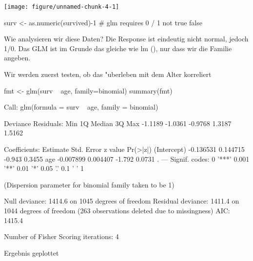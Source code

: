 \documentclass[a4paper,twoside]{tufte-book}\usepackage[]{graphicx}\usepackage[]{color}
\makeatletter
\def\maxwidth{ %
  \ifdim\Gin@nat@width>\linewidth
    \linewidth
  \else
    \Gin@nat@width
  \fi
}
\makeatother
\begin{document}
\begin{appendices}
\begin{Schunk}
\texttt{[image: figure/unnamed-chunk-4-1]} \begin{Sinput}
surv <- as.numeric(survived)-1 # glm requires 0 / 1 not true false
\end{Sinput}
\end{Schunk}


Wie analysieren wir diese Daten? Die Response ist eindeutig nicht normal, jedoch 1/0. Das GLM ist im Grunde das gleiche wie lm (), nur dass wir die Familie angeben.

Wir werden zuerst testen, ob das "uberleben mit dem Alter korreliert

\begin{Schunk}
\begin{Sinput}
fmt <- glm(surv ~ age, family=binomial)
summary(fmt)
\end{Sinput}
\begin{Soutput}

Call:
glm(formula = surv ~ age, family = binomial)

Deviance Residuals: 
    Min       1Q   Median       3Q      Max  
-1.1189  -1.0361  -0.9768   1.3187   1.5162  

Coefficients:
             Estimate Std. Error z value Pr(>|z|)  
(Intercept) -0.136531   0.144715  -0.943   0.3455  
age         -0.007899   0.004407  -1.792   0.0731 .
---
Signif. codes:  0 '***' 0.001 '**' 0.01 '*' 0.05 '.' 0.1 ' ' 1

(Dispersion parameter for binomial family taken to be 1)

    Null deviance: 1414.6  on 1045  degrees of freedom
Residual deviance: 1411.4  on 1044  degrees of freedom
  (263 observations deleted due to missingness)
AIC: 1415.4

Number of Fisher Scoring iterations: 4
\end{Soutput}
\end{Schunk}

Ergebnis geplottet

\begin{Schunk}


\end{Schunk}
\end{appendices}
\end{document}
